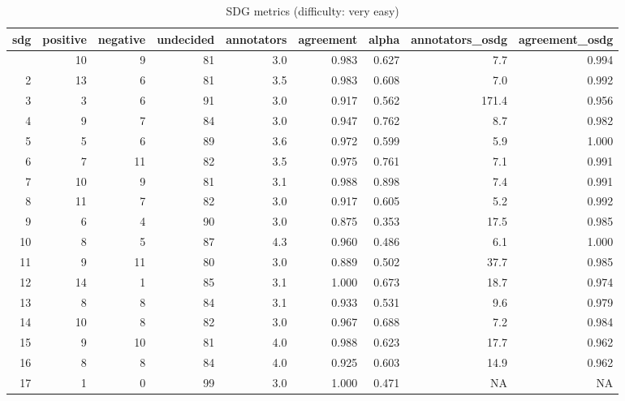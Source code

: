\begin{table}[t]
\caption*{
{\large SDG metrics (difficulty: very easy)}
} 
\fontsize{12.0pt}{14.4pt}\selectfont
\begin{tabular*}{\linewidth}{@{\extracolsep{\fill}}rrrrrrrrr}
\toprule
sdg & positive & negative & undecided & annotators & agreement & alpha & annotators\_osdg & agreement\_osdg \\ 
\midrule\addlinespace[2.5pt]
1 & 10 & 9 & 81 & 3.0 & 0.983 & 0.627 & 7.7 & 0.994 \\ 
2 & 13 & 6 & 81 & 3.5 & 0.983 & 0.608 & 7.0 & 0.992 \\ 
3 & 3 & 6 & 91 & 3.0 & 0.917 & 0.562 & 171.4 & 0.956 \\ 
4 & 9 & 7 & 84 & 3.0 & 0.947 & 0.762 & 8.7 & 0.982 \\ 
5 & 5 & 6 & 89 & 3.6 & 0.972 & 0.599 & 5.9 & 1.000 \\ 
6 & 7 & 11 & 82 & 3.5 & 0.975 & 0.761 & 7.1 & 0.991 \\ 
7 & 10 & 9 & 81 & 3.1 & 0.988 & 0.898 & 7.4 & 0.991 \\ 
8 & 11 & 7 & 82 & 3.0 & 0.917 & 0.605 & 5.2 & 0.992 \\ 
9 & 6 & 4 & 90 & 3.0 & 0.875 & 0.353 & 17.5 & 0.985 \\ 
10 & 8 & 5 & 87 & 4.3 & 0.960 & 0.486 & 6.1 & 1.000 \\ 
11 & 9 & 11 & 80 & 3.0 & 0.889 & 0.502 & 37.7 & 0.985 \\ 
12 & 14 & 1 & 85 & 3.1 & 1.000 & 0.673 & 18.7 & 0.974 \\ 
13 & 8 & 8 & 84 & 3.1 & 0.933 & 0.531 & 9.6 & 0.979 \\ 
14 & 10 & 8 & 82 & 3.0 & 0.967 & 0.688 & 7.2 & 0.984 \\ 
15 & 9 & 10 & 81 & 4.0 & 0.988 & 0.623 & 17.7 & 0.962 \\ 
16 & 8 & 8 & 84 & 4.0 & 0.925 & 0.603 & 14.9 & 0.962 \\ 
17 & 1 & 0 & 99 & 3.0 & 1.000 & 0.471 & NA & NA \\ 
\bottomrule
\end{tabular*}
\end{table}

